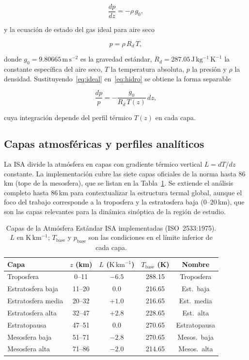 \documentclass[12pt, a4paper]{article}
\begin{document}
\begin{equation}
	\frac{dp}{dz} = -\rho\, g_0,
	\label{eq:hidro}
\end{equation}

y la ecuación de estado del gas ideal para aire seco

\begin{equation}
	p = \rho\, R_d\, T,
	\label{eq:ideal}
\end{equation}

donde $g_0 = 9.80665\,\mathrm{m\,s^{-2}}$ es la gravedad estándar,
$R_d = 287.05\,\mathrm{J\,kg^{-1}\,K^{-1}}$ la constante específica del
aire seco, $T$ la temperatura absoluta, $p$ la presión y $\rho$ la
densidad. Sustituyendo~\eqref{eq:ideal} en~\eqref{eq:hidro} se obtiene
la forma separable

\begin{equation}
	\frac{dp}{p} = -\frac{g_0}{R_d\,T(z)}\,dz,
	\label{eq:sep}
\end{equation}

cuya integración depende del perfil térmico $T(z)$ en cada capa.

\subsection{Capas atmosféricas y perfiles analíticos}

La ISA divide la atmósfera en capas con gradiente térmico vertical
$L = dT/dz$ constante. La implementación cubre las siete capas
oficiales de la norma hasta $86$\,km (tope de la mesosfera), que se
listan en la Tabla~\ref{tab:capas_isa}. Se extiende el análisis
completo hasta $86$\,km para contextualizar la estructura termal
global, aunque el foco del trabajo corresponde a la troposfera y la
estratosfera baja ($0$--$20$\,km), que son las capas relevantes para
la dinámica sinóptica de la región de estudio.

\begin{table}[H]
	\centering
	\caption{Capas de la Atmósfera Estándar ISA implementadas
		(ISO~2533:1975). $L$ en $\mathrm{K\,km^{-1}}$;
		$T_\text{base}$ y $p_\text{base}$ son las condiciones
		en el límite inferior de cada capa.}
	\label{tab:capas_isa}
	\small
	\begin{tabular}{lcccc}
		\toprule
		Capa & $z$ (km) & $L$ ($\mathrm{K\,km^{-1}}$)
		& $T_\text{base}$ (K) & Nombre \\
		\midrule
		Troposfera           &   0--11  & $-6.5$ & 288.15 & Troposfera \\
		Estratosfera baja    &  11--20  &  $0.0$ & 216.65 & Est.\ baja \\
		Estratosfera media   &  20--32  & $+1.0$ & 216.65 & Est.\ media \\
		Estratosfera alta    &  32--47  & $+2.8$ & 228.65 & Est.\ alta \\
		Estratopausa         &  47--51  &  $0.0$ & 270.65 & Estratopausa \\
		Mesosfera baja       &  51--71  & $-2.8$ & 270.65 & Mesos.\ baja \\
		Mesosfera alta       &  71--86  & $-2.0$ & 214.65 & Mesos.\ alta \\
		\bottomrule
	\end{tabular}
\end{table}
\end{document}
